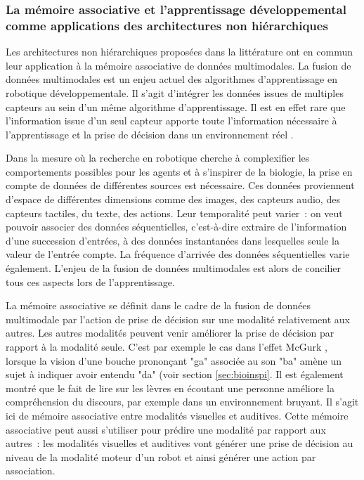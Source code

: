 \documentclass[../main]{subfiles}
\begin{document}
\subsubsection{La mémoire associative et l'apprentissage développemental comme applications des architectures non hiérarchiques}

Les architectures non hiérarchiques proposées dans la littérature ont en commun leur application à la mémoire associative de données multimodales.
La fusion de données multimodales est un enjeu actuel des algorithmes d'apprentissage en robotique développementale.
Il s'agit d'intégrer les données issues de multiples capteurs au sein d'un même algorithme d'apprentissage.
Il est en effet rare que l'information issue d'un seul capteur apporte toute l'information nécessaire à l'apprentissage et la prise de décision dans un environnement réel \parencite{lahat2015}. 

Dans la mesure où la recherche en robotique cherche à complexifier les comportements possibles pour les agents et à s'inspirer de la biologie, la prise en compte de données de différentes sources est nécessaire. Ces données proviennent d'espace de différentes dimensions comme des images, des capteurs audio, des capteurs tactiles, du texte, des actions. Leur temporalité peut varier~: on veut pouvoir associer des données séquentielles, c'est-à-dire extraire de l'information d'une succession d'entrées, à des données instantanées dans lesquelles seule la valeur de l'entrée compte. La fréquence d'arrivée des données séquentielles varie également.
L'enjeu de la fusion de données multimodales est alors de concilier tous ces aspects lors de l'apprentissage.

La mémoire associative se définit dans le cadre de la fusion de données multimodale par l'action de prise de décision sur une modalité relativement aux autres.
Les autres modalités peuvent venir améliorer la prise de décision par rapport à la modalité seule. C'est par exemple le cas dans l'effet McGurk \parencite{McGurk1976HearingLA}, lorsque la vision d'une bouche prononçant "ga" associée au son "ba" amène un sujet à indiquer avoir entendu "da" (voir section \ref{sec:bioinspi}. Il est également montré que le fait de lire sur les lèvres en écoutant une personne améliore la compréhension du discours, par exemple dans un environnement bruyant. Il s'agit ici de mémoire associative entre modalités visuelles et auditives.
Cette mémoire associative peut aussi s'utiliser pour prédire une modalité par rapport aux autres~: les modalités visuelles et auditives vont générer une prise de décision au niveau de la modalité moteur d'un robot et ainsi générer une action par association.
\end{document}
